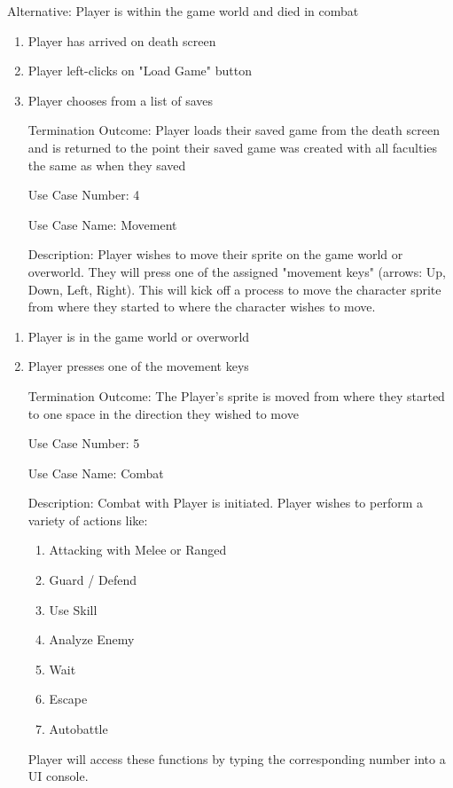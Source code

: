 \documentclass[10pt,conference,onecolumn,compsoc]{IEEEtran}
\begin{document}
Alternative: Player is within the game world and died in combat
\begin{enumerate}
\item Player has arrived on death screen
\item Player left-clicks on "Load Game" button
\item Player chooses from a list of saves
\item [Termination Outcome:] Player loads their saved game from the death screen and is returned to the point their saved game was created with all faculties the same as when they saved
\end{enumerate}

\begin{itemize}
\item[Use Case Number:] 4
\item[Use Case Name:] Movement
\item[Description:] Player wishes to move their sprite on the game world or overworld. They will press one of the assigned "movement keys" (arrows: Up, Down, Left, Right). This will kick off a process to move the character sprite from where they started to where the character wishes to move.
\end{itemize}

\begin{enumerate}
\item Player is in the game world or overworld
\item Player presses one of the movement keys
\item [Termination Outcome:] The Player's sprite is moved from where they started to one space in the direction they wished to move
\end{enumerate}

\begin{itemize}
\item[Use Case Number:] 5
\item[Use Case Name:] Combat
\item[Description:] Combat with Player is initiated. Player wishes to perform a variety of actions like: 
\begin{enumerate}
\item Attacking with Melee or Ranged
\item Guard / Defend
\item Use Skill
\item Analyze Enemy
\item Wait
\item Escape
\item Autobattle
\end{enumerate}
Player will access these functions by typing the corresponding number into a UI console.
\end{itemize}
\end{document}

